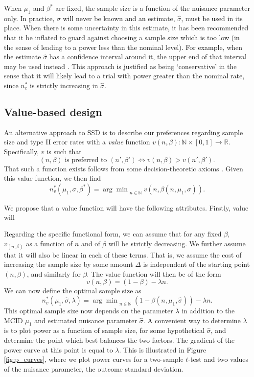 \documentclass[sagev, Crown]{sagej}
\begin{document}
When $\mu_1$ and $\beta^*$ are fixed, the sample size is a function of the nuisance parameter only. In practice, $\sigma$ will never be known and an estimate, $\hat{\sigma}$, must be used in its place. When there is some uncertainty in this estimate, it has been recommended that it be inflated to guard against choosing a sample size which is too low (in the sense of leading to a power less than the nominal level). For example, when the estimate $\hat{\sigma}$ has a confidence interval around it, the upper end of that interval may be used instead \cite{Browne1995, Teare2014}. This approach is justified as being `conservative' in the sense that it will likely lead to a trial with power greater than the nominal rate, since $n^*_c$ is strictly increasing in $\hat{\sigma}$. 

\subsection{Value-based design}

An alternative approach to SSD is to describe our preferences regarding sample size and type II error rates with a \emph{value} function $v(n, \beta): \mathbb{N} \times [0,1] \rightarrow \mathbb{R}$. Specifically, $v$ is such that
$$
(n, \beta) \text{ is preferred to }(n', \beta') \Leftrightarrow v(n, \beta) > v(n', \beta').
$$
That such a function exists follows from some decision-theoretic axioms \cite{French2000}. Given this value function, we then find
$$
n^*_v (\mu_1, \sigma, \beta^*) = {\arg\min}_{n \in \mathbb{N}}~ v(n, \beta(n, \mu_1, \sigma)).
$$

We propose that a value function will have the following attributes. Firstly, value will 

Regarding the specific functional form, we can assume that for any fixed $\beta$, $v_(n, \beta)$ as a function of $n$ and of $\beta$ will be strictly decreasing. We further assume that it will also be linear in each of these terms. That is, we assume the cost of increasing the sample size by some amount $\Delta$ is independent of the starting point $(n, \beta)$, and similarly for $\beta$. The value function will then be of the form
$$
v(n, \beta) = (1 - \beta) - \lambda n.
$$
We can now define the optimal sample size as
\begin{equation}
n^*_v (\mu_1, \hat{\sigma}, \lambda) = {\arg\min}_{n \in \mathbb{N}} ~ (1 - \beta(n, \mu_1, \hat{\sigma})) - \lambda n.
\end{equation}
This optimal sample size now depends on the parameter $\lambda$ in addition to the MCID $\mu_1$ and estimated nuisance parameter $\hat{\sigma}$. A convenient way to determine $\lambda$ is to plot power as a function of sample size, for some hypothetical $\hat{\sigma}$, and determine the point which best balances the two factors. The gradient of the power curve at this point is equal to $\lambda$. This is illustrated in Figure \ref{fig:p_curves}, where we plot power curves for a two-sample $t$-test and two values of the nuisance parameter, the outcome standard deviation. 
\end{document}
